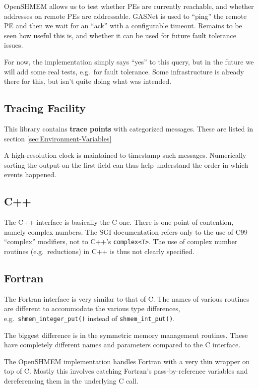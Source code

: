 \documentclass[english]{article}
\newcommand{\openshmem} {\mbox{OpenSHMEM}\xspace}
\begin{document}
\openshmem allows us to test whether PEs are currently reachable, and
whether addresses on remote PEs are addressable. GASNet is used to
``ping'' the remote PE and then we wait for an ``ack'' with a
configurable timeout. Remains to be seen how useful this is, and
whether it can be used for future fault tolerance issues.

For now, the implementation simply says ``yes'' to this query, but in
the future we will add some real tests, e.g.\ for fault tolerance.
Some infrastructure is already there for this, but isn't quite doing
what was intended.

\subsection{Tracing Facility}

This library contains \textbf{trace points} with categorized
messages. These are listed in section \ref{sec:Environment-Variables}

A high-resolution clock is maintained to timestamp such messages.
Numerically sorting the output on the first field can thus help
understand the order in which events happened.

\subsection{C++}

The C++ interface is basically the C one. There is one point of
contention, namely complex numbers. The SGI documentation refers only
to the use of C99 ``complex'' modifiers, not to C++'s
\texttt{complex<T>}.  The use of complex number routines (e.g.\
reductions) in C++ is thus not clearly specified.

\subsection{Fortran}

The Fortran interface is very similar to that of C. The names of
various routines are different to accommodate the various type
differences, e.g.\ \texttt{shmem\_integer\_put()} instead of
\texttt{shmem\_int\_put()}.

The biggest difference is in the symmetric memory management routines.
These have completely different names and parameters compared to the C
interface.

The \openshmem implementation handles Fortran with a very thin wrapper
on top of C. Mostly this involves catching Fortran's pass-by-reference
variables and dereferencing them in the underlying C call.
\end{document}
